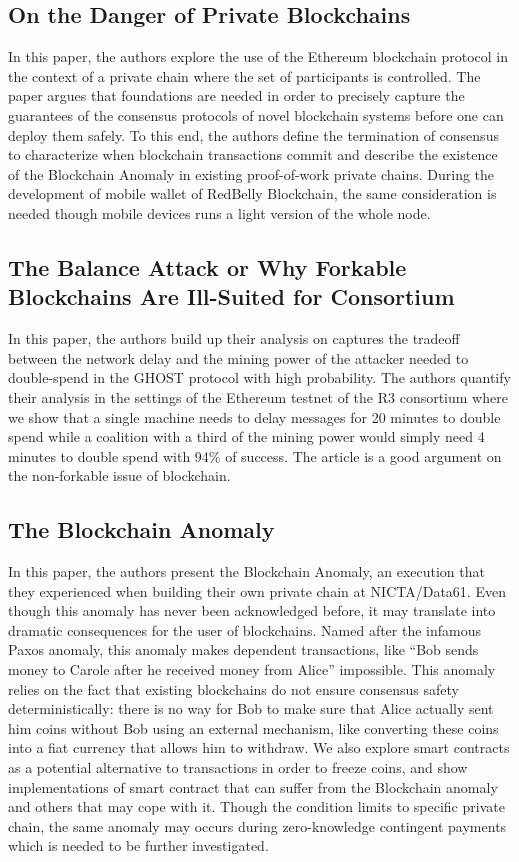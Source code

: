 \subsection{On the Danger of Private Blockchains\cite{Gra16}}

In this paper, the authors explore the use of the Ethereum blockchain protocol in the context 
of a private chain where the set of participants is controlled. The paper argues that foundations 
are needed in order to precisely capture the guarantees of the consensus protocols of novel 
blockchain systems before one can deploy them safely. To this end, the authors define the 
termination of consensus to characterize when blockchain transactions commit and describe the 
existence of the Blockchain Anomaly in existing proof-of-work private chains. During the development
of mobile wallet of RedBelly Blockchain, the same consideration is needed though mobile devices runs
a light version of the whole node.

\subsection{The Balance Attack or Why Forkable Blockchains Are Ill-Suited for Consortium\cite{NG17}}

In this paper, the authors build up their analysis on captures the tradeoff between the network 
delay and the mining power of the attacker needed to double-spend in the GHOST protocol with high 
probability. The authors quantify their analysis in the settings of the Ethereum testnet of the R3 
consortium where we show that a single machine needs to delay messages for 20 minutes to double 
spend while a coalition with a third of the mining power would simply need 4 minutes to double 
spend with 94\% of success. The article is a good argument on the non-forkable issue of blockchain.

\subsection{The Blockchain Anomaly\cite{NG16}}

In this paper, the authors present the Blockchain Anomaly, an execution that they experienced 
when building their own private chain at NICTA/Data61. Even though this anomaly has never been 
acknowledged before, it may translate into dramatic consequences for the user of blockchains. 
Named after the infamous Paxos anomaly, this anomaly makes dependent transactions, like “Bob sends 
money to Carole after he received money from Alice” impossible. This anomaly relies on the fact 
that existing blockchains do not ensure consensus safety deterministically: there is no way for 
Bob to make sure that Alice actually sent him coins without Bob using an external mechanism, 
like converting these coins into a fiat currency that allows him to withdraw. We also explore 
smart contracts as a potential alternative to transactions in order to freeze coins, and show
implementations of smart contract that can suffer from the Blockchain anomaly and others that may 
cope with it. Though the condition limits to specific private chain, the same anomaly may occurs
during zero-knowledge contingent payments which is needed to be further investigated.

